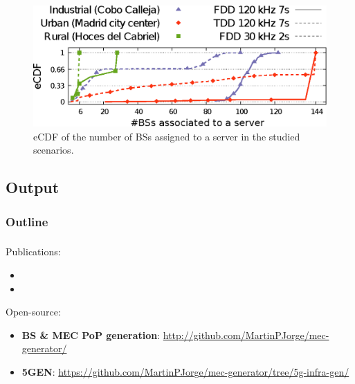 \documentclass[aspectratio=169]{beamer}
\begin{document}
\begin{frame}

    \frametitle{\secname}
    \framesubtitle{\subsecname}

    \begin{figure}[t]
        \centering
        \includegraphics[width=.8\columnwidth]{img/cdfs}
        \vspace{1em}
        \caption{eCDF of the number of BSs assigned to a server in the studied scenarios.}
        \label{fig:cdfs}
    \end{figure}
\end{frame}


\subsection{Output}
\begin{frame}
    \frametitle{Outline}
    \tableofcontents[subsectionstyle=show/shaded/hide,sectionstyle=show/shaded]
\end{frame}

\begin{frame}
    \frametitle{\secname}
    \framesubtitle{\subsecname}
    Publications:
    \begin{itemize}
        \item {}
        \item {}
    \end{itemize}
    Open-source:
    \begin{itemize}
        \item \textbf{BS \& MEC PoP generation}: \url{http://github.com/MartinPJorge/mec-generator/}
        \item \textbf{5GEN}: \url{https://github.com/MartinPJorge/mec-generator/tree/5g-infra-gen/}
    \end{itemize}
    

\end{frame}
\end{document}

